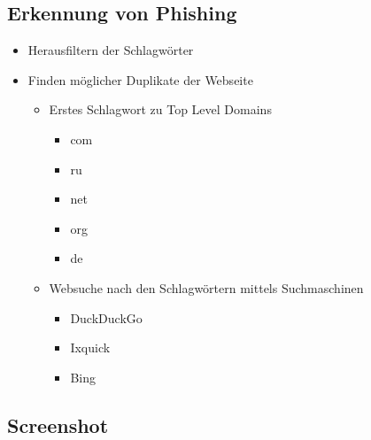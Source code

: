 \subsection{Erkennung von Phishing}
\begin{itemize}
  \item Herausfiltern der Schlagwörter
  \item Finden möglicher Duplikate der Webseite
  \begin{itemize}
    \item Erstes Schlagwort zu Top Level Domains
    \begin{itemize}
      \item com
      \item ru
      \item net
      \item org
      \item de
    \end{itemize}
    \item Websuche nach den Schlagwörtern mittels Suchmaschinen
    \begin{itemize}
      \item DuckDuckGo
      \item Ixquick
      \item Bing
    \end{itemize}
  \end{itemize}
\end{itemize}

\subsection{Screenshot}
